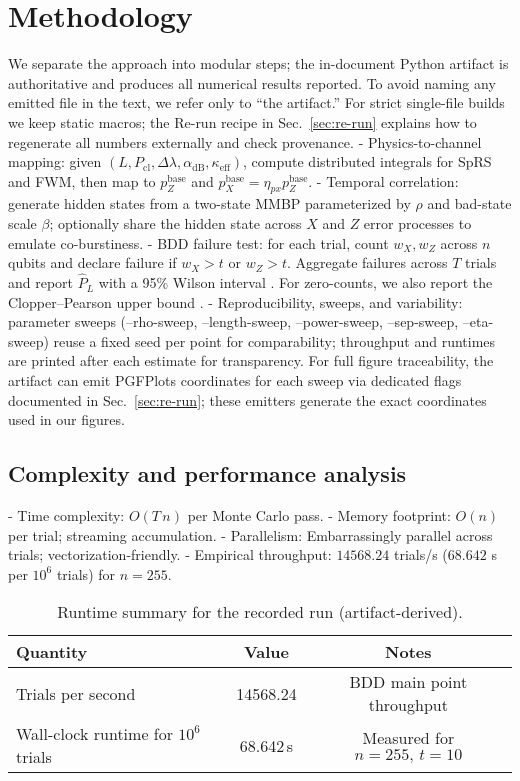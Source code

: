 \documentclass{article}
\newcommand{\val}[1]{\num[round-mode=figures,round-precision=3]{#1}}
\newcommand{\simn}{255}
\newcommand{\simt}{10}
\newcommand{\simThroughput}{14568.24}
\newcommand{\simRuntime}{68.642}
\begin{document}
\section{Methodology}\label{sec:method}
We separate the approach into modular steps; the in-document Python artifact is authoritative and produces all numerical results reported. To avoid naming any emitted file in the text, we refer only to “the artifact.” For strict single-file builds we keep static macros; the Re-run recipe in Sec.~\ref{sec:re-run} explains how to regenerate all numbers externally and check provenance.
- Physics-to-channel mapping: given \((L, P_{\mathrm{cl}}, \Delta\lambda, \alpha_{\mathrm{dB}}, \kappa_{\mathrm{eff}})\), compute distributed integrals for SpRS and FWM, then map to \(p_Z^{\text{base}}\) and \(p_X^{\text{base}}=\eta_{px}p_Z^{\text{base}}\).
- Temporal correlation: generate hidden states from a two-state MMBP parameterized by \(\rho\) and bad-state scale \(\beta\); optionally share the hidden state across \(X\) and \(Z\) error processes to emulate co-burstiness.
- BDD failure test: for each trial, count \(w_X,w_Z\) across \(n\) qubits and declare failure if \(w_X>t\) or \(w_Z>t\). Aggregate failures across \(T\) trials and report \(\hat P_L\) with a 95\% Wilson interval \cite{Wilson1927JASA}. For zero-counts, we also report the Clopper--Pearson upper bound \cite{ClopperPearson1934Biometrika}.
- Reproducibility, sweeps, and variability: parameter sweeps (--rho-sweep, --length-sweep, --power-sweep, --sep-sweep, --eta-sweep) reuse a fixed seed per point for comparability; throughput and runtimes are printed after each estimate for transparency. For full figure traceability, the artifact can emit PGFPlots coordinates for each sweep via dedicated flags documented in Sec.~\ref{sec:re-run}; these emitters generate the exact coordinates used in our figures.

\subsection{Complexity and performance analysis}
- Time complexity: \(O(T\,n)\) per Monte Carlo pass.
- Memory footprint: \(O(n)\) per trial; streaming accumulation.
- Parallelism: Embarrassingly parallel across trials; vectorization-friendly.
- Empirical throughput: \(\simThroughput\) trials/s (\(\simRuntime\) s per \(10^6\) trials) for \(n=\simn\).

\begin{table}[ht]
\small
\centering
\caption{Runtime summary for the recorded run (artifact-derived).}
\label{tab:runtime}
\begin{adjustbox}{width=\linewidth}
\begin{tabular}{lcc}
\toprule
Quantity & Value & Notes \\
\midrule
Trials per second & \val{\simThroughput} & BDD main point throughput \\
Wall-clock runtime for \(10^6\) trials & \val{\simRuntime}\,s & Measured for \(n=\simn,\,t=\simt\) \\
\bottomrule
\end{tabular}
\end{adjustbox}

\end{table}
\end{document}
